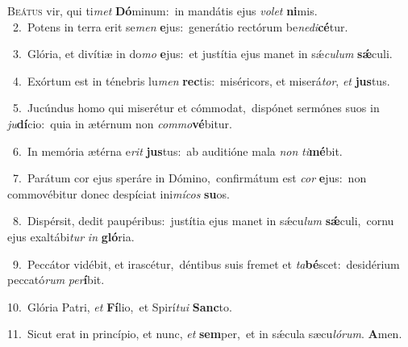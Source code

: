 \lettrine{\initial\textcolor{\initialcolor}{B}}{eátus} vir, qui ti\textit{met} \textbf{Dó}\-minum:~\star in mandátis ejus \textit{vo}\-\textit{let} \textbf{ni}\-mis.\\
{\numbfont\textcolor{\numbcolor}{~2.}}~Potens in terra erit se\textit{men} \textbf{e}\-jus:~\star generátio rectórum be\-\textit{ne}\-\textit{di}\textbf{cé}tur.\par
{\numbfont\textcolor{\numbcolor}{~3.}}~Glória, et divítiæ in do\textit{mo} \textbf{e}\-jus:~\star et justítia ejus manet in sǽ\-\textit{cu}\-\textit{lum} \textbf{sǽ}\-culi.\par
{\numbfont\textcolor{\numbcolor}{~4.}}~Exórtum est in ténebris lu\textit{men} \textbf{rec}\-tis:~\star miséricors, et miserá\-\textit{tor}\-, \textit{et} \textbf{jus}\-tus.\par
{\numbfont\textcolor{\numbcolor}{~5.}}~Jucúndus homo qui miserétur et cómmodat,~\dagger dispónet sermónes suos in \textit{ju}\-\textbf{dí}cio:~\star quia in ætérnum non \textit{com}\-\textit{mo}\textbf{vé}bitur.\par
{\numbfont\textcolor{\numbcolor}{~6.}}~In memória ætérna e\textit{rit} \textbf{jus}\-tus:~\star ab auditióne mala \textit{non} \textit{ti}\-\textbf{mé}bit.\par
{\numbfont\textcolor{\numbcolor}{~7.}}~Parátum cor ejus speráre in Dómino,~\dagger confirmátum est \textit{cor} \textbf{e}\-jus:~\star non commovébitur donec despíciat ini\-\textit{mí}\-\textit{cos} \textbf{su}\-os.\par
{\numbfont\textcolor{\numbcolor}{~8.}}~Dispérsit, dedit paupéribus:~\dagger justítia ejus manet in sǽcu\textit{lum} \textbf{sǽ}\-culi,~\star cornu ejus exaltábi\textit{tur} \textit{in} \textbf{gló}\-ria.\par
{\numbfont\textcolor{\numbcolor}{~9.}}~Peccátor vidébit, et irascétur,~\dagger déntibus suis fremet et \textit{ta}\-\textbf{bé}scet:~\star desidérium peccató\textit{rum} \textit{per}\-\textbf{í}bit.\par
{\numbfont\textcolor{\numbcolor}{10.}}~Glória Patri, \textit{et} \textbf{Fí}\-lio,~\star et Spirí\-\textit{tu}\-\textit{i} \textbf{Sanc}\-to.\par
{\numbfont\textcolor{\numbcolor}{11.}}~Sicut erat in princípio, et nunc, \textit{et} \textbf{sem}\-per,~\star et in sǽcula sæcu\-\textit{ló}\-\textit{rum}. \textbf{A}\-men.\par
